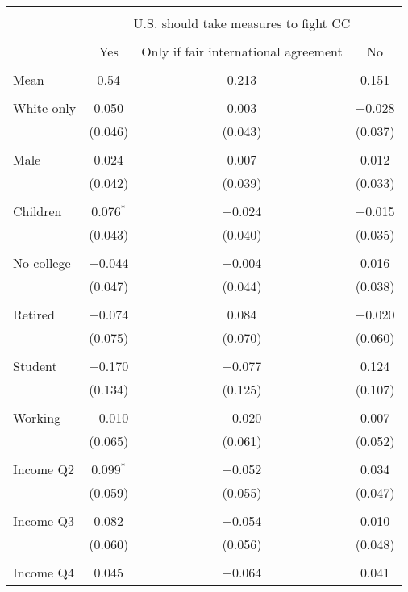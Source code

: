 
\begin{tabular}{@{\extracolsep{5pt}}lccc} 
\\[-1.8ex]\hline 
\hline \\[-1.8ex] 
 & \multicolumn{3}{c}{U.S. should take measures to fight CC} \\ 
\cline{2-4} 
\\[-1.8ex] & Yes & Only if fair international agreement & No \\ 
\hline \\[-1.8ex] 
 Mean & 0.54 & 0.213 & 0.151  \\ \hline \\[-1.8ex] White only & 0.050 & 0.003 & $-$0.028 \\ 
  & (0.046) & (0.043) & (0.037) \\ 
  & & & \\ 
 Male & 0.024 & 0.007 & 0.012 \\ 
  & (0.042) & (0.039) & (0.033) \\ 
  & & & \\ 
 Children & 0.076$^{*}$ & $-$0.024 & $-$0.015 \\ 
  & (0.043) & (0.040) & (0.035) \\ 
  & & & \\ 
 No college & $-$0.044 & $-$0.004 & 0.016 \\ 
  & (0.047) & (0.044) & (0.038) \\ 
  & & & \\ 
 Retired & $-$0.074 & 0.084 & $-$0.020 \\ 
  & (0.075) & (0.070) & (0.060) \\ 
  & & & \\ 
 Student & $-$0.170 & $-$0.077 & 0.124 \\ 
  & (0.134) & (0.125) & (0.107) \\ 
  & & & \\ 
 Working & $-$0.010 & $-$0.020 & 0.007 \\ 
  & (0.065) & (0.061) & (0.052) \\ 
  & & & \\ 
 Income Q2 & 0.099$^{*}$ & $-$0.052 & 0.034 \\ 
  & (0.059) & (0.055) & (0.047) \\ 
  & & & \\ 
 Income Q3 & 0.082 & $-$0.054 & 0.010 \\ 
  & (0.060) & (0.056) & (0.048) \\ 
  & & & \\ 
 Income Q4 & 0.045 & $-$0.064 & 0.041 \\ 

\end{tabular}
